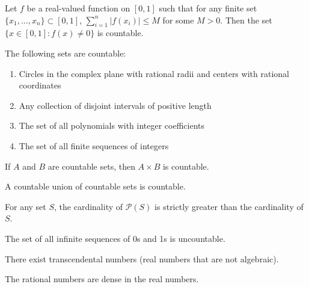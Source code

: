 \begin{theorem}
Let $f$ be a real-valued function on $[0,1]$ such that for any finite set $\{x_1, \ldots, x_n\} \subset [0,1]$, $\sum_{i=1}^n |f(x_i)| \leq M$ for some $M > 0$. Then the set $\{x \in [0,1] : f(x) \neq 0\}$ is countable.
\end{theorem}

\begin{theorem}
The following sets are countable:
\begin{enumerate}
\item Circles in the complex plane with rational radii and centers with rational coordinates
\item Any collection of disjoint intervals of positive length
\item The set of all polynomials with integer coefficients
\item The set of all finite sequences of integers
\end{enumerate}
\end{theorem}

\begin{theorem}
If $A$ and $B$ are countable sets, then $A \times B$ is countable.
\end{theorem}

\begin{theorem}
A countable union of countable sets is countable.
\end{theorem}

\begin{theorem}
For any set $S$, the cardinality of $\mathcal{P}(S)$ is strictly greater than the cardinality of $S$.
\end{theorem}

\begin{theorem}
The set of all infinite sequences of 0s and 1s is uncountable.
\end{theorem}

\begin{theorem}
There exist transcendental numbers (real numbers that are not algebraic).
\end{theorem}

\begin{theorem}
The rational numbers are dense in the real numbers.
\end{theorem}


